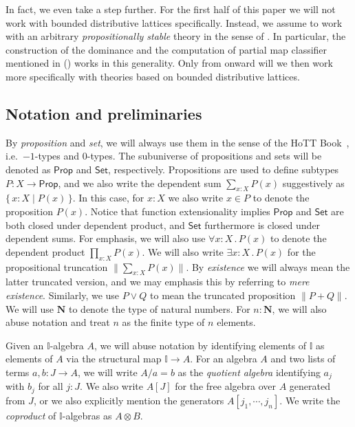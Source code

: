 \documentclass[a4paper,12pt]{amsart}
\theoremstyle{definition}
\newcommand{\mb}[1]{\mathbf{#1}}
\newcommand{\mbb}[1]{\mathbb{#1}}
\newcommand{\I}{\mbb I}
\newcommand{\ms}[1]{\mathsf{#1}}
\newcommand{\scomp}[2]{\{\,#1\mid#2\,\}}
\newcommand{\N}{\mb N}
\newcommand{\fa}[2]{\forall #1\!\colon\!\!#2\mathpunct{.}}
\newcommand{\ex}[2]{\exists #1\!\colon\!\!#2\mathpunct{.}}
\newcommand{\pss}[1]{\lVert #1\rVert} %
\newcommand{\pp}{\ms{Prop}}
\newcommand{\st}{\ms{Set}}
\begin{document}
In fact, we even take a step further. For the first half of this paper we will not work with bounded distributive lattices specifically. Instead, we assume to work with an arbitrary \emph{propositionally stable} theory in the sense of . In particular, the construction of the dominance and the computation of partial map classifier mentioned in  () works in this generality. Only from  onward will we then work more specifically with theories based on bounded distributive lattices.

\subsection*{Notation and preliminaries}

By \emph{proposition} and \emph{set}, we will always use them in the sense of the HoTT Book~\citep{hottbook}, i.e.\ $-1$-types and $0$-types. The subuniverse of propositions and sets will be denoted as $\pp$ and $\st$, respectively. Propositions are used to define subtypes $P \colon X \to \pp$, and we also write the dependent sum $\sum_{x:X}P(x)$ suggestively as $\scomp{x:X}{P(x)}$. In this case, for $x:X$ we also write $x\in P$ to denote the proposition $P(x)$. Notice that function extensionality implies $\pp$ and $\st$ are both closed under dependent product, and $\st$ furthermore is closed under dependent sums. For emphasis, we will also use $\fa xXP(x)$ to denote the dependent product $\prod_{x:X}P(x)$. We will also write $\ex xXP(x)$ for the propositional truncation $\pss{\sum_{x:X}P(x)}$. By \emph{existence} we will always mean the latter truncated version, and we may emphasis this by referring to \emph{mere existence}. Similarly, we use $P \vee Q$ to mean the truncated proposition $\pss{P + Q}$. We will use $\N$ to denote the type of natural numbers. For $n:\N$, we will also abuse notation and treat $n$ as the finite type of $n$ elements. 

Given an $\I$-algebra $A$, we will abuse notation by identifying elements of $\I$ as elements of $A$ via the structural map $\I \to A$. For an algebra $A$ and two lists of terms $a,b \colon J \to A$, 
we will write $A/a = b$ as the \emph{quotient algebra} identifying $a_j$ with $b_j$ for all $j : J$. We also write $A[J]$ for the free algebra over $A$ generated from $J$, or we also explicitly mention the generators $A[j_1,\cdots,j_n]$. We write the \emph{coproduct} of $\I$-algebras as $A \otimes B$.
\end{document}
